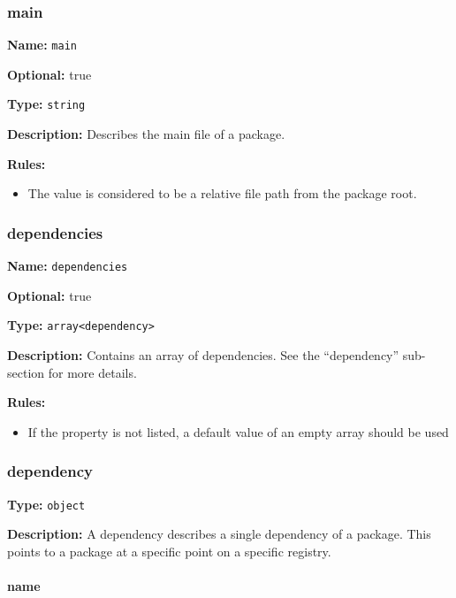 \hypertarget{main}{\subsubsection{main}\label{main}}

\textbf{Name:} \texttt{main}

\textbf{Optional:} true

\textbf{Type:} \texttt{string}

\textbf{Description:} Describes the main file of a package.

\textbf{Rules:}

\begin{itemize}
\tightlist
\item
  The value is considered to be a relative file path from the package
  root.
\end{itemize}

\hypertarget{dependencies}{\subsubsection{dependencies}\label{dependencies}}

\textbf{Name:} \texttt{dependencies}

\textbf{Optional:} true

\textbf{Type:} \texttt{array\textless{}dependency\textgreater{}}

\textbf{Description:} Contains an array of dependencies. See the
``dependency'' sub-section for more details.

\textbf{Rules:}

\begin{itemize}
\tightlist
\item
  If the property is not listed, a default value of an empty array
  should be used
\end{itemize}

\hypertarget{dependency}{\subsubsection{dependency}\label{dependency}}

\textbf{Type:} \texttt{object}

\textbf{Description:} A dependency describes a single dependency of a
package. This points to a package at a specific point on a specific
registry.

\hypertarget{name-1}{\paragraph{name}\label{name-1}}

